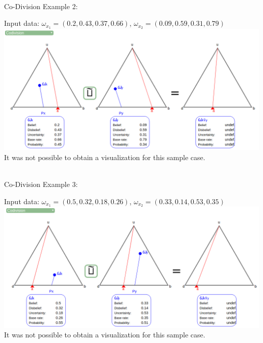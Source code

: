 \documentclass[UTF8]{article}
\newcommand{\opinion}[5]{$\omega_{#1} = (#2, #3, #4, #5)$}
\begin{document}
\hrulefill\\
Co-Division Example 2:
    \begin{center}
        Input data: 
        \opinion{x_1}{0.2}{0.43}{0.37}{0.66}, 
        \opinion{x_2}{0.09}{0.59}{0.31}{0.79}\\
        \includegraphics[width=6in]{images/codiv2.png}
        It was not possible to obtain a visualization for this sample case.
    \end{center}
    \hrulefill\\
Co-Division Example 3:
    \begin{center}
        Input data: 
        \opinion{x_1}{0.5}{0.32}{0.18}{0.26}, 
        \opinion{x_2}{0.33}{0.14}{0.53}{0.35}\\
        \includegraphics[width=6in]{images/codiv3.png}
        It was not possible to obtain a visualization for this sample case.
\end{center}
\hrulefill\\
\end{document}
